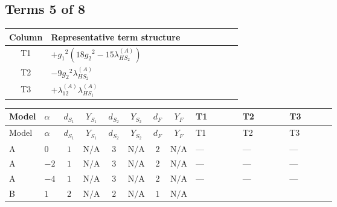 \documentclass[8pt]{article}
\begin{document}
\begin{landscape}
\subsection*{Terms 5 of 8}
\begin{center}
\begin{tabular}{@{}c >{\raggedright\arraybackslash}p{0.82\linewidth}@{}}
\toprule
Column & Representative term structure \\
\midrule
T1 & \(\displaystyle +{g_1}^2 \left(18 {g_2}^2-15 {\lambda_{HS_2}^{(A)}}\right)\) \\
\midrule
T2 & \(\displaystyle -9 {g_2}^2 {\lambda_{HS_2}^{(A)}}\) \\
\midrule
T3 & \(\displaystyle +{\lambda_{12}^{(A)}} {\lambda_{HS_1}^{(A)}}\) \\
\midrule
\bottomrule
\end{tabular}
\end{center}
\smallskip
\tiny
\begin{longtable}{@{}llcccccc >{\raggedright\arraybackslash}p{0.21\linewidth} >{\raggedright\arraybackslash}p{0.21\linewidth} >{\raggedright\arraybackslash}p{0.21\linewidth}@{}}
\toprule
Model & $\alpha$ & $d_{S_1}$ & $Y_{S_1}$ & $d_{S_2}$ & $Y_{S_2}$ & $d_F$ & $Y_F$ & T1 & T2 & T3 \\
\midrule
\endfirsthead
\toprule
Model & $\alpha$ & $d_{S_1}$ & $Y_{S_1}$ & $d_{S_2}$ & $Y_{S_2}$ & $d_F$ & $Y_F$ & T1 & T2 & T3 \\
\midrule
\endhead
A & $0$ & $1$ & $\text{N/A}$ & $3$ & $\text{N/A}$ & $2$ & $\text{N/A}$ & --- & --- & --- \\
\midrule
A & $-2$ & $1$ & $\text{N/A}$ & $3$ & $\text{N/A}$ & $2$ & $\text{N/A}$ & --- & --- & --- \\
\midrule
A & $-4$ & $1$ & $\text{N/A}$ & $3$ & $\text{N/A}$ & $2$ & $\text{N/A}$ & --- & --- & --- \\
\midrule
B & $1$ & $2$ & $\text{N/A}$ & $2$ & $\text{N/A}$ & $1$ & $\text{N/A}$ & \scriptsize\adjustbox{max width=\linewidth}{$\begin{gathered} +{g_1}^2 \left(18 {g_2}^2-15 {\lambda_{HS_2}^{(A)}}\right)\end{gathered}$} & \scriptsize\adjustbox{max width=\linewidth}{$\begin{gathered} -9 {g_2}^2 {\lambda_{HS_2}^{(A)}}\end{gathered}$} & \scriptsize\adjustbox{max width=\linewidth}{$\begin{gathered} +{\lambda_{12}^{(A)}} {\lambda_{HS_1}^{(A)}}\end{gathered}$} \\

\end{longtable}
\end{landscape}
\end{document}
